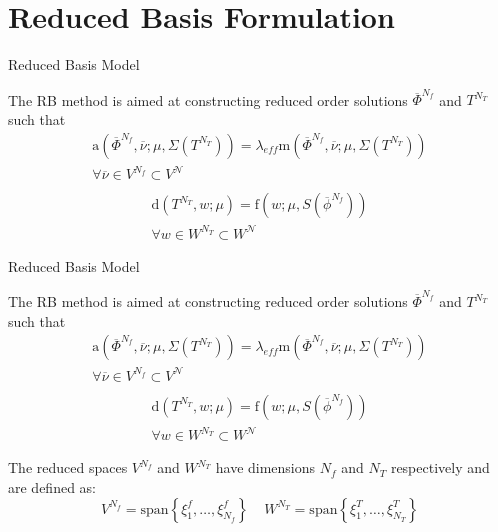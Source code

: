 \documentclass{beamer}
\renewcommand{\vec}[1]{\ensuremath{\overline{#1}}}
\begin{document}
\section{Reduced Basis Formulation}
\begin{frame}{Reduced Basis Model}
    \begin{block}{}
        The RB method is aimed at constructing reduced order solutions $\vec{\Phi}^{N_f}$ and $T^{N_T}$ such that
        \begin{equation*}
        \begin{aligned}
            \mathrm{a}\left (\vec{\Phi}^{N_f},\vec{\nu}; \mu, \Sigma(T^{N_T})\right ) = \lambda_{eff} \mathrm{m} \left (\vec{\Phi}^{N_f},\vec{\nu}; \mu, \Sigma(T^{N_T}) \right) \\ 
            \forall \vec{\nu} \in V^{N_f} \subset V^{\mathcal{N}}\\
        \end{aligned}
        \end{equation*}
        \begin{equation*}
        \begin{aligned}
        {\mathrm{d}\left(T^{N_T},w;\mu\right) = \mathrm{f}\left(w;\mu , S(\vec{\phi}^{N_f})\right)} \\ 
        \forall w \in W^{N_T} \subset W^{\mathcal{N}}
        \end{aligned}
        \end{equation*}
    \end{block}
\end{frame}

\begin{frame}{Reduced Basis Model}
    \begin{block}{}
        The RB method is aimed at constructing reduced order solutions $\vec{\Phi}^{N_f}$ and $T^{N_T}$ such that
        \begin{equation*}
        \begin{aligned}
            \mathrm{a}\left (\vec{\Phi}^{N_f},\vec{\nu}; \mu, \Sigma(T^{N_T})\right ) = \lambda_{eff} \mathrm{m} \left (\vec{\Phi}^{N_f},\vec{\nu}; \mu, \Sigma(T^{N_T}) \right) \\ 
            \forall \vec{\nu} \in V^{N_f} \subset V^{\mathcal{N}}\\
        \end{aligned}
        \end{equation*}
        \begin{equation*}
        \begin{aligned}
        {\mathrm{d}\left(T^{N_T},w;\mu\right) = \mathrm{f}\left(w;\mu , S(\vec{\phi}^{N_f})\right)} \\ 
        \forall w \in W^{N_T} \subset W^{\mathcal{N}}
        \end{aligned}
        \end{equation*}
    \end{block}
    The reduced spaces $V^{N_f}$ and $W^{N_T}$ have dimensions $N_f$ and $N_T$ respectively and are defined as:
    \[V^{N_f} = \mathrm{span}\left\{ \xi_1^f, \dots, \xi_{N_f}^f \right \} \mspace{20mu}
    W^{N_T} = \mathrm{span}\left\{ \xi_1^T, \dots, \xi_{N_T}^T \right \}\]
\end{frame}
\end{document}
